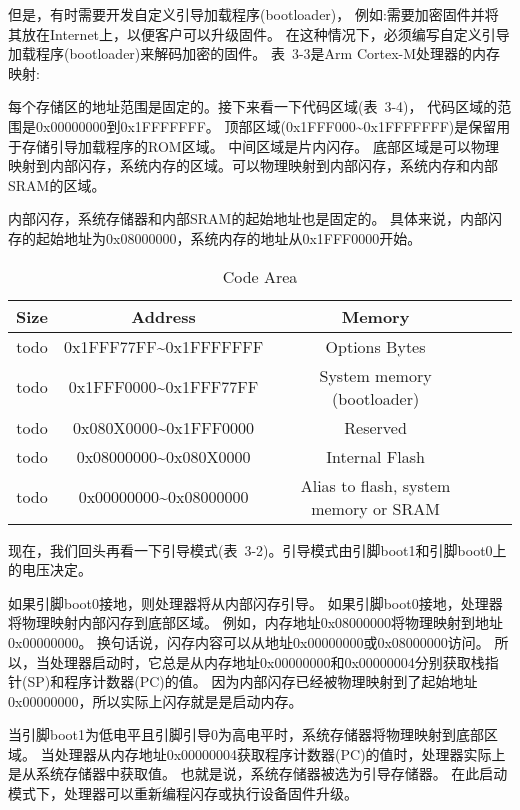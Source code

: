但是，有时需要开发自定义引导加载程序(bootloader)，
例如:需要加密固件并将其放在Internet上，以便客户可以升级固件。
在这种情况下，必须编写自定义引导加载程序(bootloader)来解码加密的固件。
表~3-3是Arm Cortex-M处理器的内存映射:


每个存储区的地址范围是固定的。接下来看一下代码区域(表~3-4)，
代码区域的范围是0x00000000到0x1FFFFFFF。
顶部区域(0x1FFF000\textasciitilde0x1FFFFFFF)是保留用于存储引导加载程序的ROM区域。
中间区域是片内闪存。
底部区域是可以物理映射到内部闪存，系统内存的区域。可以物理映射到内部闪存，系统内存和内部SRAM的区域。

内部闪存，系统存储器和内部SRAM的起始地址也是固定的。
具体来说，内部闪存的起始地址为0x08000000，系统内存的地址从0x1FFF0000开始。
\begin{table}[htbp]
    \caption{ Code Area }\label{tab:table1}
    \vspace{0.5em}\centering\wuhao
    \begin{tabular}{ccccc}
    \toprule[1.5pt]
    Size & Address & Memory \\
    \midrule[1pt]
    todo & 0x1FFF77FF\textasciitilde0x1FFFFFFF & Options Bytes \\
    todo & 0x1FFF0000\textasciitilde0x1FFF77FF & System memory (bootloader)\\
    todo & 0x080X0000\textasciitilde0x1FFF0000 & Reserved \\
    todo & 0x08000000\textasciitilde0x080X0000 & Internal Flash \\
    todo & 0x00000000\textasciitilde0x08000000 & Alias to flash, system memory or SRAM \\
  
    \bottomrule[1.5pt]
    \end{tabular}
    \vspace{\baselineskip}
    \end{table}

现在，我们回头再看一下引导模式(表~3-2)。引导模式由引脚boot1和引脚boot0上的电压决定。

如果引脚boot0接地，则处理器将从内部闪存引导。
如果引脚boot0接地，处理器将物理映射内部闪存到底部区域。
例如，内存地址0x08000000将物理映射到地址0x00000000。
换句话说，闪存内容可以从地址0x00000000或0x08000000访问。
所以，当处理器启动时，它总是从内存地址0x00000000和0x00000004分别获取栈指针(SP)和程序计数器(PC)的值。
因为内部闪存已经被物理映射到了起始地址0x00000000，所以实际上闪存就是是启动内存。

当引脚boot1为低电平且引脚引导0为高电平时，系统存储器将物理映射到底部区域。
当处理器从内存地址0x00000004获取程序计数器(PC)的值时，处理器实际上是从系统存储器中获取值。
也就是说，系统存储器被选为引导存储器。
在此启动模式下，处理器可以重新编程闪存或执行设备固件升级。

